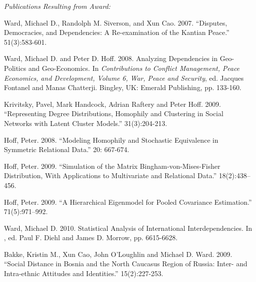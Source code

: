 \documentclass[pdftex,12pt,fullpage,oneside]{amsart}
\begin{document}
\textit{Publications Resulting from Award:}\begin{list}{}{\leftmargin=1em} \small
\item Ward, Michael D., Randolph M. Siverson, and Xun Cao. 2007. ``Disputes, Democracies, and Dependencies: A Re-examination of the
  Kantian Peace.''  51(3):583-601.

\item Ward, Michael D. and Peter D. Hoff. 2008. Analyzing
  Dependencies in Geo-Politics and Geo-Economics.  \newblock In \textit{Contributions to
    Conflict Management, Peace Economics, and Development, Volume 6,
    War, Peace and Security}, ed. Jacques Fontanel and Manas Chatterji. Bingley, UK: Emerald Publishing, pp. 133-160.

\item Krivitsky, Pavel, Mark Handcock, Adrian Raftery and Peter Hoff. 2009. ``Representing Degree Distributions, Homophily and Clustering in
  Social Networks with Latent Cluster Models.''  31(3):204-213.

\item  Hoff, Peter. 2008. ``Modeling Homophily and Stochastic Equivalence in
  Symmetric Relational Data.''  20: 667-674.

\item Hoff, Peter. 2009. ``Simulation of the Matrix Bingham-von-Mises-Fisher
  Distribution, With Applications to Multivariate and Relational
  Data.''  18(2):438--456.

\item Hoff, Peter. 2009. ``A Hierarchical Eigenmodel for Pooled Covariance
  Estimation.''  71(5):971--992.
  
\item Ward, Michael D. 2010. Statistical Analysis of
  International Interdependencies. In , ed. Paul F. Diehl and
  James D. Morrow, pp. 6615-6628.
  
\item Bakke, Kristin M., Xun Cao, John O'Loughlin and Michael D. Ward. 2009. ``Social Distance in Bosnia and the North Caucasus Region
  of Russia: Inter- and Intra-ethnic Attitudes and Identities.''  15(2):227-253.


\end{list}
\end{document}
